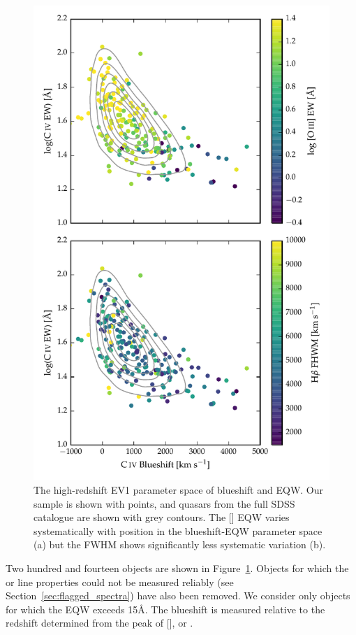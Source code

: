 \begin{figure}
    \includegraphics[width=\columnwidth]{figures/chapter04/ev1.pdf} 
    \caption[{The high-redshift EV1 parameter space of  blueshift and EQW.}]{The high-redshift EV1 parameter space of  blueshift and EQW. Our sample is shown with points, and quasars from the full SDSS catalogue are shown with grey contours. The [] EQW varies systematically with position in the  blueshift-EQW parameter space (a) but the \hb FWHM shows significantly less systematic variation (b).}      
    \label{fig:ev1}
\end{figure}

Two hundred and fourteen objects are shown in Figure~\ref{fig:ev1}.
Objects for which the \hb or  line properties could not be measured reliably (see Section~\ref{sec:flagged_spectra}) have also been removed. 
We consider only objects for which the  EQW exceeds 15\AA. 
The  blueshift is measured relative to the redshift determined from the peak of [], \hb or \hans. 

